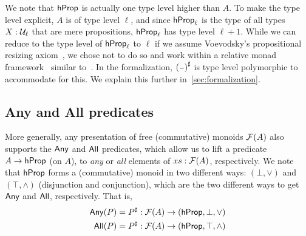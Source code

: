 We note that $\mathsf{hProp}$ is actually one type level higher than $A$.
To make the type level explicit, $A$ is of type level $\ell$, and since $\mathsf{hProp}_\ell$
is the type of all types $X : \mathcal{U}_\ell$ that are mere propositions, $\mathsf{hProp}_\ell$ has
type level $\ell + 1$. While we can reduce to the type level of $\mathsf{hProp}_\ell$ to $\ell$ if
we assume Voevodsky's propositional resizing axiom~\cite{voevodskyResizingRulesTheir2011},
we chose not to do so and work within a relative monad framework~\cite{arkor_formal_2023}
similar to~\cite[Section~3]{choudhuryFreeCommutativeMonoids2023}. In the formalization,
${({\scriptstyle{-}})}^{\sharp}$ is type level polymorphic to accommodate for this. We explain this
further in~\cref{sec:formalization}.


\subsection{Any and All predicates}

More generally, any presentation of free (commutative) monoids $\mathcal{F}(A)$ also supports the
$\operatorname{\mathsf{Any}}$ and $\operatorname{\mathsf{All}}$ predicates, which allow us to lift a predicate $A \to \mathsf{hProp}$ (on $A$),
to \emph{any} or \emph{all} elements of $xs : \mathcal{F}(A)$, respectively.
%
We note that $\mathsf{hProp}$ forms a (commutative) monoid in two different ways: $(\bot,\vee)$ and $(\top,\wedge)$
(disjunction and conjunction), which are the two different ways to get $\operatorname{\mathsf{Any}}$ and $\operatorname{\mathsf{All}}$, respectively.
That is,
\begin{align*}
    \mathsf{Any}(P) & = {P}^{\sharp} : \mathcal{F}(A) \to (\mathsf{hProp}, \bot, \vee)   \\
    \mathsf{All}(P) & = {P}^{\sharp} : \mathcal{F}(A) \to (\mathsf{hProp}, \top, \wedge)
\end{align*}

